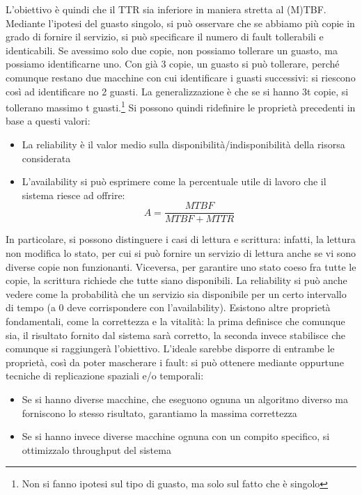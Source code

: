 L'obiettivo è quindi che il TTR sia inferiore in maniera stretta al (M)TBF.
Mediante l'ipotesi del guasto singolo, si può osservare che se abbiamo più copie in grado di fornire il servizio, si
può specificare il numero di fault tollerabili e identicabili. Se avessimo solo due copie, non possiamo tollerare un
guasto, ma possiamo identificarne uno. Con già 3 copie, un guasto si può tollerare,
perché comunque restano due macchine con cui identificare i guasti successivi:
si riescono così ad identificare no 2 guasti. La generalizzazione è che se si hanno 3t copie, si tollerano massimo t
guasti.\footnote{Non si fanno ipotesi sul tipo di guasto, ma solo sul fatto che è singolo} Si possono quindi
ridefinire le proprietà precedenti in base a questi valori:
\begin{itemize}
 \item La reliability è il valor medio sulla disponibilità/indisponibilità della risorsa considerata
 \item L'availability si può esprimere come la percentuale utile di lavoro che il sistema riesce ad offrire:
 \begin{equation}
  A = \frac{MTBF}{MTBF + MTTR}
 \end{equation}
\end{itemize}
In particolare, si possono distinguere i casi di lettura e scrittura: infatti, la lettura non modifica lo stato, per
cui si può fornire un servizio di lettura anche se vi sono diverse copie non funzionanti. Viceversa, per garantire uno
stato coeso fra tutte le copie, la scrittura richiede che tutte siano disponibili.
La reliability si può anche vedere come la probabilità che un servizio sia disponibile per un certo intervallo di 
tempo (a 0 deve corrispondere con l'availability).
Esistono altre proprietà fondamentali, come la correttezza e la vitalità: la prima definisce che comunque sia, il
risultato fornito dal sistema sarà corretto, la seconda invece stabilisce che comunque si raggiungerà l'obiettivo.
L'ideale sarebbe disporre di entrambe le proprietà, così da poter mascherare i fault: si può ottenere mediante 
oppurtune tecniche di replicazione spaziali e/o temporali:
\begin{itemize}
 \item Se si hanno diverse macchine, che eseguono ognuna un algoritmo diverso ma forniscono lo stesso risultato,
 garantiamo la massima correttezza
 \item Se si hanno invece diverse macchine ognuna con un compito specifico, si ottimizzalo throughput del sistema
\end{itemize}

